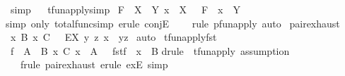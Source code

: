 \begin{isabellebody}
%
\isadelimproof
%
\endisadelimproof
%
\isatagproof
{}\isamarkupfalse%
\ simp%
\endisatagproof
{\isafoldproof}%
%
\isadelimproof
%
\endisadelimproof
\ \isanewline
\isanewline
\isanewline
{}\isamarkupfalse%
\ tfun{\isacharunderscore}apply{\isacharbrackleft}simp{\isacharbrackright}{\isacharcolon}\isanewline
{\isachardoublequoteopen}{\isacharbrackleft}{\isacharbar}\ F\ {\isacharcolon}\ X\ {\isacharminus}{\isacharminus}{\isacharminus}{\isachargreater}\ Y{\isacharsemicolon}\ x\ {\isacharcolon}\ X\ {\isacharbar}{\isacharbrackright}\ {\isacharequal}{\isacharequal}{\isachargreater}\ F\ {\isacharpercent}{\isacharcircum}\ x\ {\isacharcolon}\ Y{\isachardoublequoteclose}\isanewline
%
\isadelimproof
%
\endisadelimproof
%
\isatagproof
{}\isamarkupfalse%
{\isacharparenleft}simp\ only{\isacharcolon}\ total{\isacharunderscore}func{\isacharunderscore}simp{\isacharcomma}\ erule\ conjE{\isacharcomma}\ \isanewline
\ \ \ rule\ pfun{\isacharunderscore}apply{\isacharcomma}\ auto{\isacharparenright}%
\endisatagproof
{\isafoldproof}%
%
\isadelimproof
\isanewline
%
\endisadelimproof
\isanewline
\isanewline
\isanewline
{}\isamarkupfalse%
\ pair{\isacharunderscore}exhaust{\isacharcolon}\isanewline
{\isachardoublequoteopen}{\isacharbrackleft}{\isacharbar}\ x{\isacharcolon}\ B\ {\isacharpercent}x\ C\ {\isacharbar}{\isacharbrackright}\ {\isacharequal}{\isacharequal}{\isachargreater}\ EX\ y\ z{\isachardot}\ x\ {\isacharequal}\ {\isacharparenleft}y{\isacharcomma}z{\isacharparenright}{\isachardoublequoteclose}\isanewline
%
\isadelimproof
%
\endisadelimproof
%
\isatagproof
{}\isamarkupfalse%
\ auto%
\endisatagproof
{\isafoldproof}%
%
\isadelimproof
\isanewline
%
\endisadelimproof
\isanewline
{}\isamarkupfalse%
\ tfun{\isacharunderscore}apply{\isacharunderscore}fst{\isacharcolon}\isanewline
{\isachardoublequoteopen}{\isacharbrackleft}{\isacharbar}\ f\ {\isacharcolon}\ A\ {\isacharminus}{\isacharminus}{\isacharminus}{\isachargreater}\ B\ {\isacharpercent}x\ C{\isacharsemicolon}\ x\ {\isacharcolon}\ A\ {\isacharbar}{\isacharbrackright}\ {\isacharequal}{\isacharequal}{\isachargreater}\ fst{\isacharparenleft}f\ {\isacharpercent}{\isacharcircum}\ x{\isacharparenright}\ {\isacharcolon}\ B{\isachardoublequoteclose}\isanewline
%
\isadelimproof
%
\endisadelimproof
%
\isatagproof
{}\isamarkupfalse%
{\isacharparenleft}drule\ \ tfun{\isacharunderscore}apply{\isacharcomma}\ assumption{\isacharparenright}\isanewline
{}\isamarkupfalse%
\ \ \ {\isacharparenleft}frule\ pair{\isacharunderscore}exhaust{\isacharcomma}\ {\isacharparenleft}erule\ exE{\isacharparenright}{\isacharplus}{\isacharcomma}\ simp{\isacharparenright}%

\end{isabellebody}
